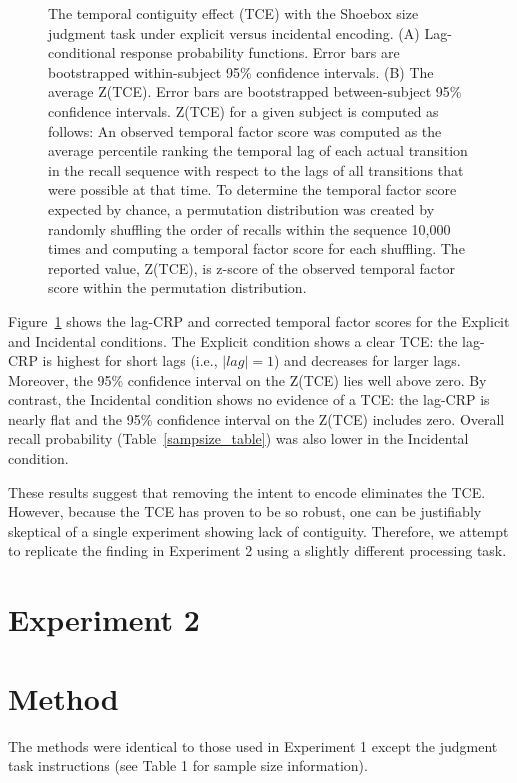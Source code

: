 \documentclass[man,natbib,floatsintext]{apa6} %
\begin{document}
\newcommand\paneltext{(A) Lag-conditional response probability functions. Error bars are bootstrapped within-subject 95\% confidence intervals. (B) The average Z(TCE).  Error bars are bootstrapped between-subject 95\% confidence intervals. Z(TCE) for a given subject is computed as follows: An observed temporal factor score was computed as the average percentile ranking the temporal lag of each actual transition in the recall sequence with respect to the lags of all transitions that were possible at that time. To determine the temporal factor score expected by chance, a permutation distribution was created by randomly shuffling the order of recalls within the sequence 10,000 times and computing a temporal factor score for each shuffling. The reported value, Z(TCE), is z-score of the observed temporal factor score within the permutation distribution.}
\begin{figure}
\caption{The temporal contiguity effect (TCE) with the Shoebox size judgment task under explicit versus incidental encoding. \paneltext}
\label{shoebox}
\end{figure}

Figure~\ref{shoebox} shows the lag-CRP and corrected temporal factor scores for the Explicit and Incidental conditions. The Explicit condition shows a clear TCE: the lag-CRP is highest for short lags (i.e., $|lag|=1$) and decreases for larger lags. Moreover, the 95\% confidence interval on the Z(TCE) lies well above zero. By contrast, the Incidental condition shows no evidence of a TCE: the lag-CRP is nearly flat and the 95\% confidence interval on the Z(TCE) includes zero. Overall recall probability (Table~\ref{sampsize_table}) was also lower in the Incidental condition.

These results suggest that removing the intent to encode eliminates the TCE. However, because the TCE has proven to be so robust, one can be justifiably skeptical of a single experiment showing lack of contiguity. Therefore, we attempt to replicate the finding in Experiment 2 using a slightly different processing task.

\section{Experiment 2}
\section{Method}

The methods were identical to those used in Experiment 1 except the judgment task instructions (see Table 1 for sample size information).
\end{document}
